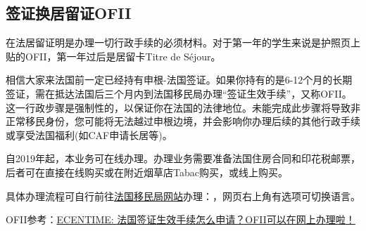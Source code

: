 \subsection{签证换居留证OFII}

在法居留证明是办理一切行政手续的必须材料。对于第一年的学生来说是护照页上贴的OFII，第一年过后是居留卡Titre de Séjour。

相信大家来法国前一定已经持有申根-法国签证。如果你持有的是6-12个月的长期签证，需在抵达法国后三个月内到法国移民局办理“签证生效手续”，又称OFII。 这一行政步骤是强制性的，以保证你在法国的法律地位。未能完成此步骤将导致非正常移民身份，您可能将无法越过申根边境，并会影响你办理后续的其他行政手续或享受法国福利(如CAF申请长居等)。

自2019年起，本业务可在线办理。办理业务需要准备法国住房合同和印花税邮票，后者可在直接在线购买或在附近烟草店Tabac购买，或线上购买。

具体办理流程可自行前往\href{https://administration-etrangers-en-france.interieur.gouv.fr}{法国移民局网站}办理：，网页右上角有选项可切换语言。

OFII参考：\href{https://www.ecentime.com/article/tuto-ofii}{ECENTIME: 法国签证生效手续怎么申请？OFII可以在网上办理啦！}
